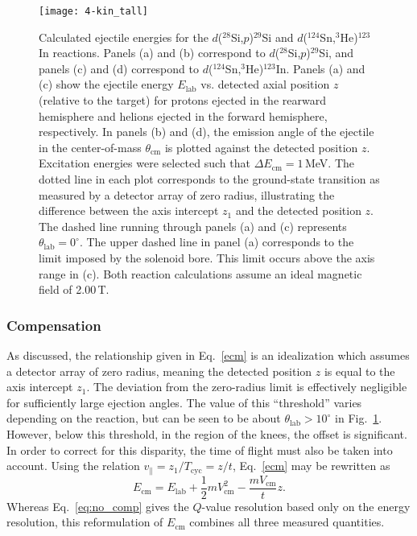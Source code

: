 \begin{figure}
\centering
\texttt{[image: 4-kin\_tall]}
\caption[Calculated ejectile energies for the $d$($^{28}$Si,$p$)$^{29}$Si and $d$($^{124}$Sn,$^3$He)$^{123}$In reactions]{Calculated ejectile energies for the $d$($^{28}$Si,$p$)$^{29}$Si and $d$($^{124}$Sn,$^3$He)$^{123}$In reactions. Panels (a) and (b) correspond to $d$($^{28}$Si,$p$)$^{29}$Si,
 and panels (c) and (d) correspond to $d$($^{124}$Sn,$^3$He)$^{123}$In.
Panels (a) and (c) show the ejectile energy $E_\mathrm{lab}$ vs. detected axial position $z$ (relative to the target) for protons ejected in the rearward hemisphere and helions ejected in the forward hemisphere, respectively.  In panels (b) and (d), the emission angle of the ejectile in the center-of-mass $\theta_\textrm{cm}$ is plotted against the detected position $z$.  Excitation energies were selected such that $\Delta E_\mathrm{cm}=1$\,MeV.  The dotted line in each plot corresponds to the ground-\-state transition as measured by a detector array of zero radius, illustrating the difference between the axis intercept $z_1$ and the detected position $z$.  The dashed line running through panels (a) and (c) represents $\theta_\textrm{lab}=0^\circ$.  The upper dashed line in panel (a) corresponds to the limit imposed by the solenoid bore.  This limit occurs above the axis range in (c).  Both reaction calculations assume an ideal magnetic field of 2.00\,T.}
\label{analytic}
\end{figure}

\subsubsection{Compensation}
As discussed, the relationship given in Eq.~\ref{ecm} is an idealization which assumes a detector array of zero radius, meaning the detected position $z$ is equal to the axis intercept $z_1$.  The deviation from the zero-radius limit is effectively negligible for sufficiently large ejection angles.  The value of this ``threshold'' varies depending on the reaction, but can be seen to be about $\theta_\mathrm{lab}>10^\circ$ in Fig.~\ref{analytic}.  However, below this threshold, in the region of the knees, the offset is significant. In order to correct for this disparity, the time of flight must also be taken into account.  Using the relation $v_\parallel=z_1/T_\mathrm{cyc}=z/t$, Eq.~\ref{ecm} may be rewritten as 
\begin{equation}
E_\mathrm{cm}=E_\mathrm{lab}+\frac{1}{2} mV_\mathrm{cm}^2-\frac{m V_\mathrm{cm}}{t}z.
\label{ecm_new}
\end{equation}
Whereas Eq.~\ref{eq:no_comp} gives the $Q$-value resolution based only on the energy resolution, this reformulation of $E_\mathrm{cm}$ combines all three measured quantities.   

